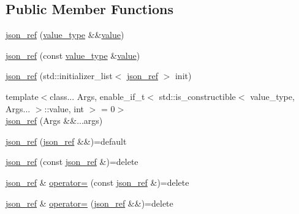 \subsection*{Public Member Functions}
\begin{DoxyCompactItemize}
\item 
\hyperlink{classnlohmann_1_1detail_1_1json__ref_ae1adf5bcee8b6fa0c358710604fb1938}{json\+\_\+ref} (\hyperlink{classnlohmann_1_1detail_1_1json__ref_a78d76cf288141049568c0d670ed670ef}{value\+\_\+type} \&\&\hyperlink{namespacenlohmann_1_1detail_a2fb6dae6578e06ae73ca0d7cc8512b1aa2063c1608d6e0baf80249c42e2be5804}{value})
\item 
\hyperlink{classnlohmann_1_1detail_1_1json__ref_a8c3eb3c6e952ed0cd7eece586ab4047c}{json\+\_\+ref} (const \hyperlink{classnlohmann_1_1detail_1_1json__ref_a78d76cf288141049568c0d670ed670ef}{value\+\_\+type} \&\hyperlink{namespacenlohmann_1_1detail_a2fb6dae6578e06ae73ca0d7cc8512b1aa2063c1608d6e0baf80249c42e2be5804}{value})
\item 
\hyperlink{classnlohmann_1_1detail_1_1json__ref_adfba2db547283a7c6a5df9a32e72efc5}{json\+\_\+ref} (std\+::initializer\+\_\+list$<$ \hyperlink{classnlohmann_1_1detail_1_1json__ref}{json\+\_\+ref} $>$ init)
\item 
{\footnotesize template$<$class... Args, enable\+\_\+if\+\_\+t$<$ std\+::is\+\_\+constructible$<$ value\+\_\+type, Args... $>$\+::value, int $>$  = 0$>$ }\\\hyperlink{classnlohmann_1_1detail_1_1json__ref_a2b4538e16d0e921d22626b5e47993abe}{json\+\_\+ref} (Args \&\&...args)
\item 
\hyperlink{classnlohmann_1_1detail_1_1json__ref_a59221ddbd756ca24d289c787fab38dbc}{json\+\_\+ref} (\hyperlink{classnlohmann_1_1detail_1_1json__ref}{json\+\_\+ref} \&\&)=default
\item 
\hyperlink{classnlohmann_1_1detail_1_1json__ref_a4c68db46934e03588bbd73b00147c0dd}{json\+\_\+ref} (const \hyperlink{classnlohmann_1_1detail_1_1json__ref}{json\+\_\+ref} \&)=delete
\item 
\hyperlink{classnlohmann_1_1detail_1_1json__ref}{json\+\_\+ref} \& \hyperlink{classnlohmann_1_1detail_1_1json__ref_a98956ba676b1ae16b62346f9c4fb752e}{operator=} (const \hyperlink{classnlohmann_1_1detail_1_1json__ref}{json\+\_\+ref} \&)=delete
\item 
\hyperlink{classnlohmann_1_1detail_1_1json__ref}{json\+\_\+ref} \& \hyperlink{classnlohmann_1_1detail_1_1json__ref_a9a73363d9be6b300ddd30745786c50a6}{operator=} (\hyperlink{classnlohmann_1_1detail_1_1json__ref}{json\+\_\+ref} \&\&)=delete

\end{DoxyCompactItemize}
